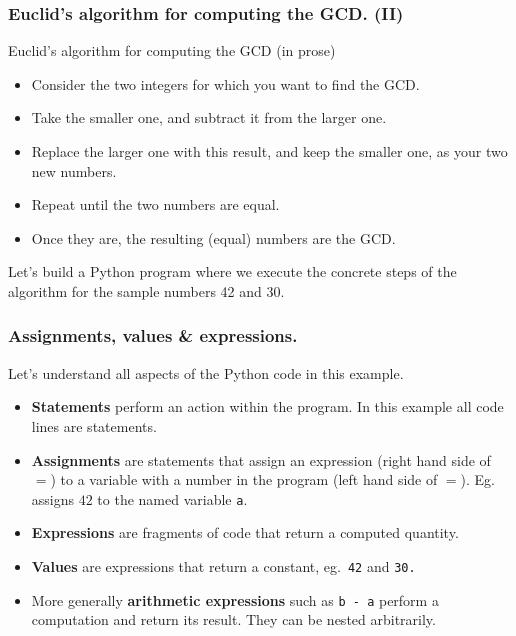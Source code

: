 \documentclass{beamer} %
\newcommand\emc[1]{\textcolor{brightblue}{\textbf{#1}}}
\begin{document}
\begin{frame}
\frametitle{Euclid's algorithm for computing the GCD. (II)} 

\begin{block}{Euclid's algorithm for computing the GCD (in prose)}
\begin{itemize}
\item Consider the two integers for which you want to find the GCD.
\item Take the smaller one, and subtract it from the larger one. 
\item Replace the larger one with this result, and keep the smaller one, as your two new numbers. 
\item Repeat until the two numbers are equal. 
\item Once they are, the resulting (equal) numbers are the GCD.  
\end{itemize}
\end{block}

Let's build a Python program where we execute the concrete steps of the algorithm for the sample numbers 42 and 30.

\end{frame}



\begin{frame}
\frametitle{Assignments, values \& expressions.}

Let's understand all aspects of the Python code in this example.
\begin{itemize}
\item \emc{Statements} perform an action within the program. In this example all code lines are statements.
\item \emc{Assignments} are statements that assign an expression (right hand side of $=$) to a variable with a number in the program (left hand side of $=$). 
Eg.\  assigns $42$ to the named variable \texttt{a}.
\item \emc{Expressions} are fragments of code that return a computed quantity.
\item \emc{Values} are expressions that return a constant, eg.\ \texttt{42} and \texttt{30.}
\item More generally \emc{arithmetic expressions} such as \texttt{b - a} perform a computation and return its result. They can be nested arbitrarily.
\end{itemize}

\end{frame}
\end{document}
